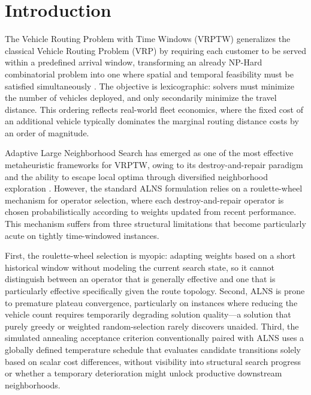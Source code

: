 \documentclass[journal]{IEEEtran}
\begin{document}
\section{Introduction}
\label{sec:intro}

The Vehicle Routing Problem with Time Windows (VRPTW) generalizes the classical Vehicle Routing Problem (VRP) by requiring each customer to be served within a predefined arrival window, transforming an already NP-Hard combinatorial problem into one where spatial and temporal feasibility must be satisfied simultaneously \cite{Dantzig1959, Solomon1987}.
The objective is lexicographic: solvers must minimize the number of vehicles deployed, and only secondarily minimize the travel distance. This ordering reflects real-world fleet economics, where the fixed cost of an additional vehicle typically dominates the marginal routing distance costs by an order of magnitude.

Adaptive Large Neighborhood Search has emerged as one of the most effective metaheuristic frameworks for VRPTW, owing to its destroy-and-repair paradigm and the ability to escape local optima through diversified neighborhood exploration \cite{shaw1998using, Ropke2006, pisinger2007general}. However, the standard ALNS formulation relies on a roulette-wheel mechanism for operator selection, where each destroy-and-repair operator is chosen probabilistically according to weights updated from recent performance. This mechanism suffers from three structural limitations that become particularly acute on tightly time-windowed instances.

First, the roulette-wheel selection is myopic: adapting weights based on a short historical window without modeling the current search state, so it cannot distinguish between an operator that is generally effective and one that is particularly effective specifically given the route topology.
Second, ALNS is prone to premature plateau convergence, particularly on instances where reducing the vehicle count requires temporarily degrading solution quality---a solution that purely greedy or weighted random-selection rarely discovers unaided.
Third, the simulated annealing acceptance criterion conventionally paired with ALNS uses a globally defined temperature schedule that evaluates candidate transitions solely based on scalar cost differences, without visibility into structural search progress or whether a temporary deterioration might unlock productive downstream neighborhoods.
\end{document}
